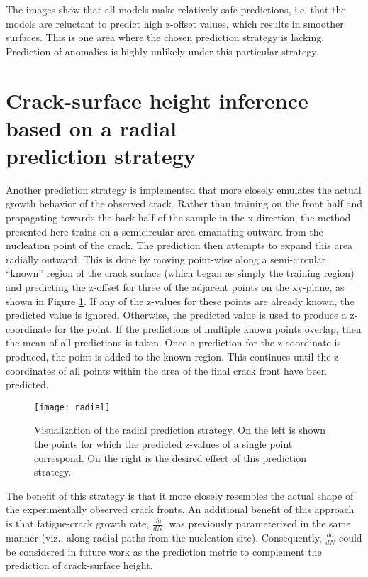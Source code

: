 The images show that all models make relatively safe predictions, i.e. that the models are reluctant to predict high z-offset values, which results in smoother surfaces.  This is one area where the chosen prediction strategy is lacking.  Prediction of anomalies is highly unlikely under this particular strategy.

\section[Crack-surface height inference based on a radial prediction strategy]{Crack-surface height inference based on a radial \\ prediction strategy}
Another prediction strategy is implemented that more closely emulates the actual growth behavior of the observed crack.  Rather than training on the front half and propagating towards the back half of the sample in the x-direction, the method presented here trains on a semicircular area emanating outward from the nucleation point of the crack.  The prediction then attempts to expand this area radially outward.  This is done by moving point-wise along a semi-circular ``known'' region of the crack surface (which began as simply the training region) and predicting the z-offset for three of the adjacent points on the xy-plane, as shown in Figure \ref{fig:radial}.  If any of the z-values for these points are already known, the predicted value is ignored.  Otherwise, the predicted value is used to produce a z-coordinate for the point.  If the predictions of multiple known points overlap, then the mean of all predictions is taken.  Once a prediction for the z-coordinate is produced, the point is added to the known region.  This continues until the z-coordinates of all points within the area of the final crack front have been predicted.

\begin{figure}[b]
  \centering
    \texttt{[image: radial]}
    \caption{Visualization of the radial prediction strategy.  On the left is shown the points for which the predicted z-values of a single point correspond.  On the right is the desired effect of this prediction strategy.}
  \label{fig:radial}
\end{figure}

The benefit of this strategy is that it more closely resembles the actual shape of the experimentally observed crack fronts.  An additional benefit of this approach is that fatigue-crack growth rate, $\frac{da}{dN}$, was previously parameterized in the same manner (viz., along radial paths from the nucleation site). Consequently, $\frac{da}{dN}$ could be considered in future work as the prediction metric to complement the prediction of crack-surface height.

